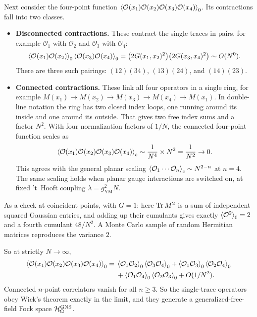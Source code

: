 Next consider the four-point function
$\braket{\mathcal{O}(x_1)\mathcal{O}(x_2)\mathcal{O}(x_3)\mathcal{O}(x_4)}_0$. Its contractions fall into two
classes.
\begin{itemize}
\item \textbf{Disconnected contractions.} These contract the single traces in pairs, for example
$\mathcal{O}_1$ with $\mathcal{O}_2$ and $\mathcal{O}_3$ with $\mathcal{O}_4$:
\[
\braket{\mathcal{O}(x_1)\mathcal{O}(x_2)}_0 \braket{\mathcal{O}(x_3)\mathcal{O}(x_4)}_0 = \big(2 G(x_1,x_2)^2\big)\big(2 G(x_3,x_4)^2\big) \sim O(N^0) .
\]
There are three such pairings: $(12)(34)$, $(13)(24)$, and $(14)(23)$.
\item \textbf{Connected contractions.} These link all four operators in a single ring, for example
$M(x_1) \to M(x_2) \to M(x_3) \to M(x_4) \to M(x_1)$. In double-line notation the ring has two closed index
loops, one running around its inside and one around its outside. That gives two free index sums and a factor
$N^2$. With four normalization factors of $1/N$, the connected four-point function scales as
\[
\braket{\mathcal{O}(x_1)\mathcal{O}(x_2)\mathcal{O}(x_3)\mathcal{O}(x_4)}_c \sim \frac{1}{N^4} \times N^2 = \frac{1}{N^2} \to 0 .
\]
This agrees with the general planar scaling $\braket{\mathcal{O}_1\cdots\mathcal{O}_n}_c \sim N^{2-n}$ at
$n=4$. The same scaling holds when planar gauge interactions are switched on, at fixed 't~Hooft coupling
$\lambda = g_{\text{YM}}^2 N$.
\end{itemize}
As a check at coincident points, with $G=1$: here $\operatorname{Tr} M^2$ is a sum of independent squared Gaussian entries,
and adding up their cumulants gives exactly $\braket{\mathcal O^2}_0=2$ and a fourth cumulant $48/N^2$. A Monte
Carlo sample of random Hermitian matrices reproduces the variance $2$.

So at strictly $N\to\infty$,
\[
\begin{split}
\braket{\mathcal{O}(x_1)\mathcal{O}(x_2)\mathcal{O}(x_3)\mathcal{O}(x_4)}_0
={}& \braket{\mathcal{O}_1\mathcal{O}_2}_0\braket{\mathcal{O}_3\mathcal{O}_4}_0
+ \braket{\mathcal{O}_1\mathcal{O}_3}_0\braket{\mathcal{O}_2\mathcal{O}_4}_0 \\
&+ \braket{\mathcal{O}_1\mathcal{O}_4}_0\braket{\mathcal{O}_2\mathcal{O}_3}_0 + O(1/N^2) .
\end{split}
\]
Connected $n$-point correlators vanish for all $n \ge 3$. So the single-trace operators obey Wick's theorem
exactly in the limit, and they generate a generalized-free-field Fock space $\mathcal{H}_\Omega^{\text{GNS}}$.

